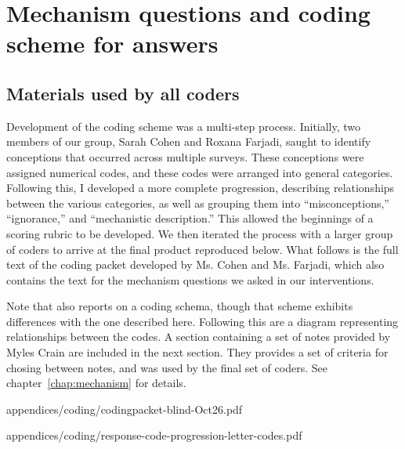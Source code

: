 \chapter{Mechanism questions and coding scheme for answers}
\label{app:coding}

\section{Materials used by all coders}
\label{sec:materials}

Development of the coding scheme was a multi-step process. Initially, two
members of our group, Sarah Cohen and Roxana Farjadi, saught to identify
conceptions that occurred across multiple surveys. These conceptions were
assigned numerical codes, and these codes were arranged into general categories.
Following this, I developed a more complete progression, describing
relationships between the various categories, as well as grouping them into
“misconceptions,” “ignorance,” and “mechanistic description.” This allowed the
beginnings of a scoring rubric to be developed. We then iterated the process
with a larger group of coders to arrive at the final product reproduced below.
What follows is the full text of the coding packet developed by Ms. Cohen and
Ms. Farjadi, which also contains the text for the mechanism questions we
asked in our interventions. 

Note that \textcite{cohen_san_2012_f} also reports on a coding schema, though
that scheme exhibits differences with the one described here. Following this are
a diagram representing relationships between the codes. A section containing a
set of notes provided by Myles Crain are included in the next section. They
provides a set of criteria for chosing between notes, and was used by the final
set of coders. See chapter~\ref{chap:mechanism} for details.

           {appendices/coding/codingpacket-blind-Oct26.pdf}


           {appendices/coding/response-code-progression-letter-codes.pdf}


